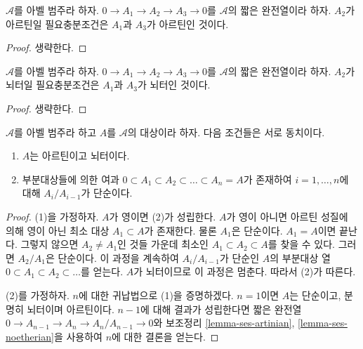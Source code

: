 \begin{lemma}
\label{lemma-ses-artinian}
$\mathcal{A}$를 아벨 범주라 하자.
$0 \to A_1 \to A_2 \to A_3 \to 0$를 $\mathcal{A}$의 짧은
완전열이라 하자. $A_2$가 아르틴일 필요충분조건은 $A_1$과 $A_3$가
아르틴인 것이다.
\end{lemma}

\begin{proof}
생략한다.
\end{proof}

\begin{lemma}
\label{lemma-ses-noetherian}
$\mathcal{A}$를 아벨 범주라 하자.
$0 \to A_1 \to A_2 \to A_3 \to 0$를 $\mathcal{A}$의 짧은
완전열이라 하자. $A_2$가 뇌터일 필요충분조건은 $A_1$과 $A_3$가
뇌터인 것이다.
\end{lemma}

\begin{proof}
생략한다.
\end{proof}

\begin{lemma}
\label{lemma-finite-length}
$\mathcal{A}$를 아벨 범주라 하고 $A$를 $\mathcal{A}$의 대상이라
하자. 다음 조건들은 서로 동치이다.
\begin{enumerate}
\item $A$는 아르틴이고 뇌터이다.
\item 부분대상들에 의한 여과
$0 \subset A_1 \subset A_2 \subset \ldots \subset A_n = A$가
존재하여 $i = 1, \ldots, n$에 대해 $A_i/A_{i - 1}$가 단순이다.
\end{enumerate}
\end{lemma}

\begin{proof}
(1)을 가정하자. $A$가 영이면 (2)가 성립한다. $A$가 영이 아니면
아르틴 성질에 의해 영이 아닌 최소 대상 $A_1 \subset A$가 존재한다.
물론 $A_1$은 단순이다. $A_1 = A$이면 끝난다. 그렇지 않으면
$A_2 \not = A_1$인 것들 가운데 최소인
$A_1 \subset A_2 \subset A$를 찾을 수 있다. 그러면 $A_2/A_1$은
단순이다. 이 과정을 계속하여 $A_i/A_{i - 1}$가 단순인 $A$의
부분대상 열 $0 \subset A_1 \subset A_2 \subset \ldots $를 얻는다.
$A$가 뇌터이므로 이 과정은 멈춘다. 따라서 (2)가 따른다.

\medskip\noindent
(2)를 가정하자. $n$에 대한 귀납법으로 (1)을 증명하겠다.
$n = 1$이면 $A$는 단순이고, 분명히 뇌터이며 아르틴이다.
$n - 1$에 대해 결과가 성립한다면 짧은 완전열
$0 \to A_{n - 1} \to A_n \to A_n/A_{n - 1} \to 0$와 보조정리
\ref{lemma-ses-artinian}, \ref{lemma-ses-noetherian}을 사용하여
$n$에 대한 결론을 얻는다.
\end{proof}

